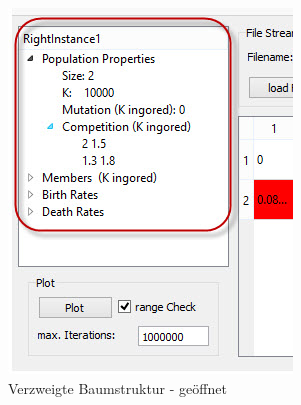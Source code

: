 \documentclass[11pt, a4paper, german]{article}
\theoremstyle{plain}
\begin{document}
\begin{center}
\begin{minipage}{0.45\textwidth}
\begin{figure}[H]
			\includegraphics[width=1\linewidth]{./Pictures/MainWindow_ParameterBaum_offen}
			\caption[MainWindow_Parameter]{Verzweigte Baumstruktur - geöffnet}
			\label{Baumstruktur_offen}
		\end{figure}
	\end{minipage}
	\end{center}
		
\end{document}
